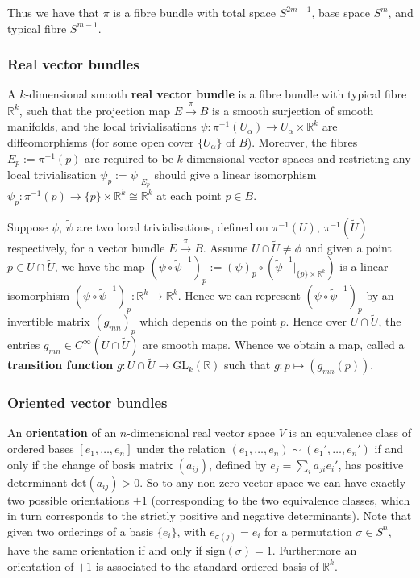 \documentclass[a4paper]{article}
\theoremstyle{definition} \newtheorem*{definition}{Definition}
\theoremstyle{definition} \newtheorem*{definitions}{Definitions}
\theoremstyle{plain} \newtheorem{theorem}{Theorem}[section]
\theoremstyle{plain} \newtheorem{proposition}[theorem]{Proposition}
\theoremstyle{plain} \newtheorem{corollary}[theorem]{Corollary}
\theoremstyle{plain} \newtheorem{lemma}[theorem]{Lemma}
\theoremstyle{plain} \newtheorem{example}[theorem]{Example}
\newcommand{\defn}[1]{\textbf{#1}}
\newcommand{\realnos}{\mathbb{R}}
\newcommand{\canonicaliso}{\cong}
\begin{document}
Thus we have that $\pi$ is a fibre bundle with total space $S^{2m-1}$, base space $S^m$, and typical fibre $S^{m-1}$. 

\subsubsection{Real vector bundles}

A $k$-dimensional smooth \defn{real vector bundle} is a fibre bundle with typical fibre $\realnos^k$, such that the projection map $E\xrightarrow{\pi} B$ is a smooth surjection of smooth manifolds, and the local trivialisations $\psi:\pi^{-1}(U_\alpha) \rightarrow U_\alpha \times \realnos^k$ are diffeomorphisms (for some open cover $\{U_\alpha\}$ of $B$). Moreover, the fibres $E_p:=\pi^{-1}(p)$ are required to be $k$-dimensional vector spaces and restricting any local trivialisation $\psi_p:=\psi \vert_{E_p}$ should give a linear isomorphism $\psi_p:\pi^{-1}(p)\rightarrow \{p\} \times \realnos^k \canonicaliso \realnos^k$ at each point $p\in B$.

Suppose $\psi$, $\tilde{\psi}$ are two local trivialisations, defined on $\pi^{-1}(U)$, $\pi^{-1}(\tilde{U})$ respectively,
for a vector bundle $E\xrightarrow{\pi} B$. Assume $U \cap \tilde{U}\neq \phi$ and given a 
point $p\in U \cap \tilde{U}$, we have the map $(\psi \circ \tilde{\psi}^{-1})_p:=(\psi)_p \circ (\tilde{\psi}^{-1}\vert_{\{p\}\times \realnos^k})$ 
is a linear isomorphism $(\psi \circ \tilde{\psi}^{-1})_p : \realnos^k \rightarrow \realnos^k$. Hence we can represent $(\psi \circ \tilde{\psi}^{-1})_p$ by an invertible matrix $(g_{mn})_p$ which depends on the point $p$. Hence over $U\cap \tilde{U}$, the entries $g_{mn}\in C^\infty(U\cap \tilde{U})$ are smooth maps. Whence we obtain a map, called a \defn{transition function}
$g:U\cap \tilde{U}\rightarrow \mathrm{GL}_k(\realnos)$ such that $g:p\mapsto (g_{mn}(p))$. 

\subsubsection{Oriented vector bundles}

An \defn{orientation} of an $n$-dimensional real vector space $V$ is an equivalence class of ordered bases $[e_1, \ldots, e_n]$ under the relation $(e_1, \ldots, e_n)\sim (e_1', \ldots, e_n')$ if and only if the change of basis matrix $(a_{ij})$, defined by $e_j=\sum_i a_{ji}e_i'$, has positive determinant $\mathrm{det}(a_{ij})>0$. So to any non-zero vector space we can have exactly two possible orientations $\pm 1$ (corresponding to the two equivalence classes, which in turn corresponds to the strictly positive and negative determinants). Note that given two orderings of a basis $\{e_i\}$, with $e_{\sigma(j)}=e_i$ for a permutation $\sigma\in S^n$, have the same orientation if and only if $\mathrm{sign}(\sigma)=1$. Furthermore an orientation of $+1$ is associated to the standard ordered basis of $\realnos^k$.  
\end{document}
